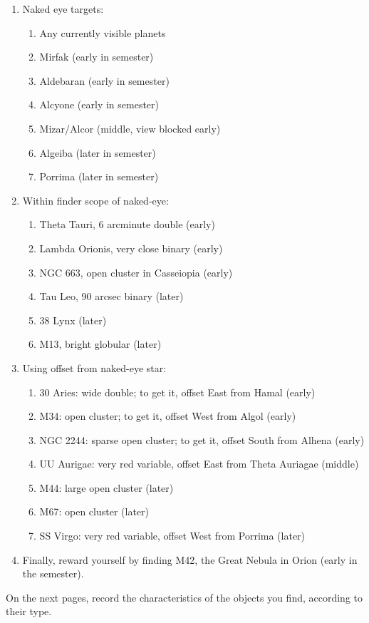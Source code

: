 \begin{enumerate}
\item Naked eye targets:
\begin{enumerate}
\item Any currently visible planets
\item Mirfak (early in semester)
\item Aldebaran (early in semester)
\item Alcyone (early in semester)
\item Mizar/Alcor (middle, view blocked early)
\item Algeiba (later in semester)
\item Porrima (later in semester)
\end{enumerate}
\item Within finder scope of naked-eye:
\begin{enumerate}
\item Theta Tauri, 6 arcminute double (early)
\item Lambda Orionis, very close binary (early)
\item NGC 663, open cluster in Casseiopia (early)
\item Tau Leo, 90 arcsec binary (later)
\item 38 Lynx (later)
\item M13, bright globular (later)
\end{enumerate}
\item Using offset from naked-eye star:
\begin{enumerate}
\item 30 Aries: wide double; to get it, offset East from Hamal (early)
\item M34: open cluster; to get it, offset West from Algol (early)
\item NGC 2244: sparse open cluster; to get it, offset South from 
  Alhena (early)
\item UU Aurigae: very red variable, offset East from Theta Auriagae (middle)
\item M44: large open cluster (later)
\item M67: open cluster (later)
\item SS Virgo: very red variable, offset West from Porrima (later)
\end{enumerate}
\item Finally, reward yourself by finding M42, the Great Nebula in
  Orion (early in the semester).
\end{enumerate}

\medskip\noindent 
On the next pages, record the characteristics of the
objects you find, according to their type.

